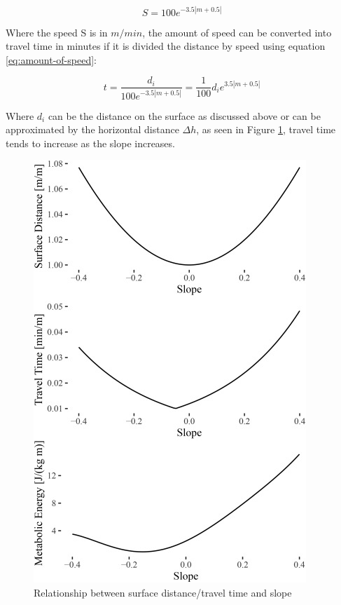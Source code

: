 \documentclass[
11pt, %
oneside, %
english, %
singlespacing, %
]{macthesis} %
\begin{document}
\begin{equation}
S = 100 e^{-3.5 |m + 0.5|}
\label{eq:slope-linked-to-speed-via-formula}
\end{equation}

Where the speed S is in \(m/min\), the amount of speed can be converted into travel time in minutes if it is divided the distance by speed using equation \eqref{eq:amount-of-speed}:

\begin{equation}
t = \frac{d_i}{100 e^{-3.5 |m + 0.5|}} = \frac{1}{100} d_i e^{3.5 |m + 0.5|}
\label{eq:amount-of-speed}
\end{equation}

Where \(d_i\) can be the distance on the surface as discussed above or can be approximated by the horizontal distance \(\Delta h\), as seen in Figure \ref{fig:surface-distance}, travel time tends to increase as the slope increases.

\begin{figure}

{\centering \includegraphics[width=0.9\linewidth]{figure/ch02-Fig-03} 

}

\caption{Relationship between surface distance/travel time and slope}\label{fig:surface-distance}
\end{figure}
\end{document}
